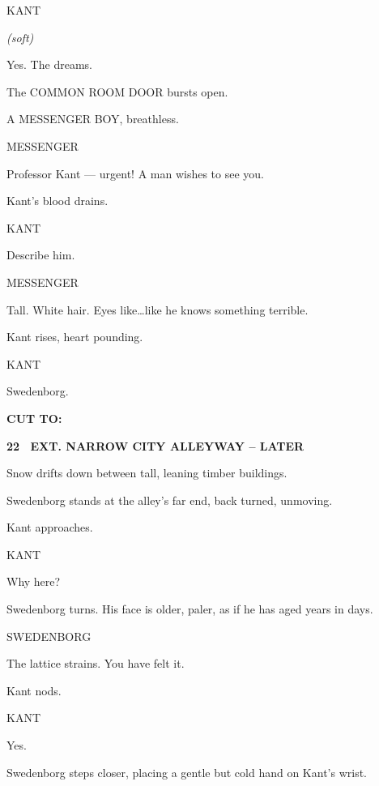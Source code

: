 \documentclass[12pt]{article}
\newcommand{\scene}[2]{%
  \vspace{1.8\baselineskip}%
  \noindent\textbf{#1 \ #2}\par\vspace{0.4\baselineskip}%
}
\newenvironment{dialogue}[1]{%
  \vspace{0.8\baselineskip}%
  \noindent\hspace*{2.3in}\textsc{#1}\par%
  \noindent\hspace*{1.5in}\begin{minipage}[t]{4.5in}%
}{%
  \end{minipage}\par%
}
\newcommand{\paren}[1]{%
  \noindent\hspace*{1.8in}\textit{(#1)}\par%
}
\newcommand{\transition}[1]{%
  \vspace{0.6\baselineskip}%
  \begin{flushright}\textbf{#1}\end{flushright}%
}
\begin{document}
\begin{dialogue}{KANT}
\paren{soft}
Yes. The dreams.
\end{dialogue}

The COMMON ROOM DOOR bursts open.

A MESSENGER BOY, breathless.

\begin{dialogue}{MESSENGER}
Professor Kant — urgent! A man wishes to see you.
\end{dialogue}

Kant’s blood drains.

\begin{dialogue}{KANT}
Describe him.
\end{dialogue}

\begin{dialogue}{MESSENGER}
Tall. White hair. Eyes like\ldots like he knows something terrible.
\end{dialogue}

Kant rises, heart pounding.

\begin{dialogue}{KANT}
Swedenborg.
\end{dialogue}

\transition{CUT TO:}


\scene{22}{EXT. NARROW CITY ALLEYWAY -- LATER}

Snow drifts down between tall, leaning timber buildings.

Swedenborg stands at the alley’s far end, back turned, unmoving.

Kant approaches.

\begin{dialogue}{KANT}
Why here?
\end{dialogue}

Swedenborg turns. His face is older, paler, as if he has aged years in
days.

\begin{dialogue}{SWEDENBORG}
The lattice strains. You have felt it.
\end{dialogue}

Kant nods.

\begin{dialogue}{KANT}
Yes.
\end{dialogue}

Swedenborg steps closer, placing a gentle but cold hand on Kant’s wrist.
\end{document}
